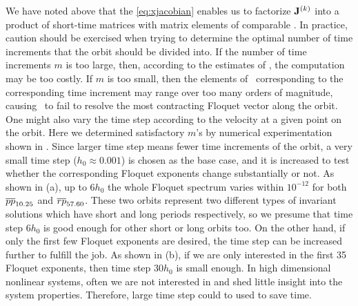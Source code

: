 \documentclass[final,leqno,onefignum,onetabnum]{siamltexmm}
\begin{document}
We have noted above that the 
\eqref{eq:xjacobian} enables us to factorize
$\mathbf{J}^{(k)}$ into a product of short-time matrices with matrix
elements of comparable . In practice, caution should be
exercised when trying to determine the optimal number of time increments
that the orbit should be divided into. If the number of time increments
$m$ is too large, then, according to the estimates of
, the computation may be too costly. If $m$ is too
small, then the elements of \JacobianM\ corresponding to the
corresponding time increment may range over too many orders of magnitude,
causing \ped\ to fail to resolve the most contracting Floquet vector
along the orbit. One
might also vary the time step according to the velocity at a given point
on the orbit. Here we determined satisfactory $m$'s by numerical
experimentation shown in . Since larger time step means
fewer time increments of the orbit, a very small time step ($h_0 \approx 0.001$)
is chosen as the base case, and it is increased to test whether the
corresponding Floquet exponents change substantially or not. As shown in
 (a), up to $6h_0$ the whole Floquet spectrum varies within
$10^{-12}$ for both ${\overline{pp}}_{10.25}$ and ${\overline{rp}}_{57.60}$. These
two orbits represent two different types of invariant solutions which have
short and long periods respectively,
so we presume that time step $6h_0$ is good enough
for other short or long orbits too. On the other hand, if only the first
few Floquet exponents are desired, the time step can be increased further
to fulfill the job. As shown in  (b), if we are only
interested in the first 35 Floquet exponents, then time step $30h_0$ is small
enough. In high dimensional nonlinear systems, often we are not interested in  and shed little
insight into the system properties. Therefore, large time step could to used to
save time.
\end{document}
